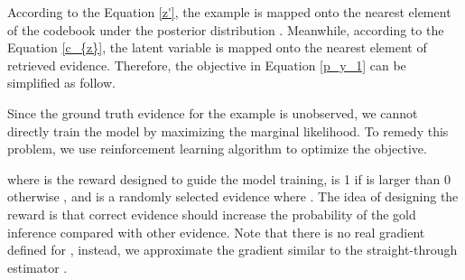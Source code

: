 \documentclass[11pt,a4paper]{article}
\begin{document}
According to the Equation \ref{z'}, the example  is mapped onto the nearest element  of the codebook under the posterior distribution . Meanwhile, according to the Equation \ref{c_{z}}, the latent variable  is mapped onto the nearest element  of retrieved evidence. 
Therefore, the objective in Equation \ref{p_y_1} can be simplified as follow.



Since the ground truth evidence for the example is unobserved, we cannot directly train the model by maximizing the marginal likelihood. To remedy this problem, we use reinforcement learning algorithm to optimize the objective.

where  is the reward designed to guide the model training,  is 1 if  is larger than 0 otherwise , and  is a randomly selected evidence where . 
The idea of designing the reward is that correct evidence should increase the probability of the gold inference compared with other evidence.
Note that there is no real gradient defined for , instead, we approximate the gradient similar to the straight-through estimator \cite{bengio2013estimating}.
\end{document}
